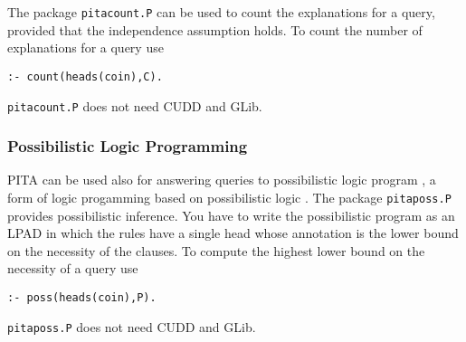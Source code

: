 The package \texttt{pitacount.P} can be used to count the explanations for a query, provided that the independence assumption holds. To count the number of explanations for a query use
\begin{verbatim}
:- count(heads(coin),C).
\end{verbatim}
\texttt{pitacount.P} does not need CUDD and GLib.

\subsubsection{Possibilistic Logic Programming}
PITA can be used also for answering queries to possibilistic logic program \cite{DBLP:conf/iclp/DuboisLP91}, a form of logic progamming based on possibilistic logic \cite{DubLanPra-poss-94}. The package \texttt{pitaposs.P} provides possibilistic inference. 
You have to write the possibilistic program as an LPAD in which the rules have a single head whose annotation is the lower bound on the  necessity of the clauses. To compute the highest  lower bound on the necessity of a query
use
\begin{verbatim}
:- poss(heads(coin),P).
\end{verbatim}
\texttt{pitaposs.P} does not need CUDD and GLib.

